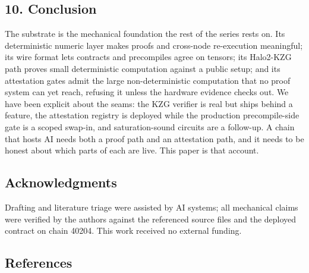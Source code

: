 \subsection{10. Conclusion}\label{conclusion}

The substrate is the mechanical foundation the rest of the series rests
on. Its deterministic numeric layer makes proofs and cross-node
re-execution meaningful; its wire format lets contracts and precompiles
agree on tensors; its Halo2-KZG path proves small deterministic
computation against a public setup; and its attestation gates admit the
large non-deterministic computation that no proof system can yet reach,
refusing it unless the hardware evidence checks out. We have been
explicit about the seams: the KZG verifier is real but ships behind a
feature, the attestation registry is deployed while the production
precompile-side gate is a scoped swap-in, and saturation-sound circuits
are a follow-up. A chain that hosts AI needs both a proof path and an
attestation path, and it needs to be honest about which parts of each
are live. This paper is that account.

\subsection{Acknowledgments}\label{acknowledgments}

Drafting and literature triage were assisted by AI systems; all
mechanical claims were verified by the authors against the referenced
source files and the deployed contract on chain 40204. This work
received no external funding.

\subsection{References}\label{references}

